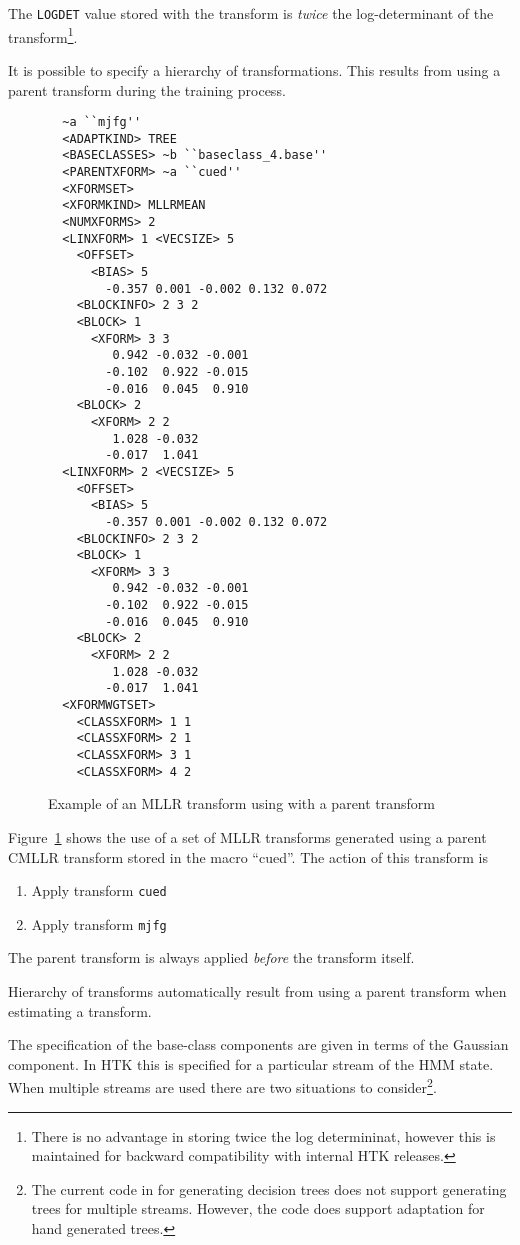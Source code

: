 The {\tt LOGDET} value stored with the transform is {\em twice} the 
log-determinant of the transform\footnote{There is no advantage in storing 
twice the log determininat, however this is maintained for backward
compatibility with internal HTK releases.}.

It is possible to specify a hierarchy of transformations. This results
from using a parent transform during the training process.
\begin{figure}[htbp]
\begin{verbatim}
  ~a ``mjfg''
  <ADAPTKIND> TREE
  <BASECLASSES> ~b ``baseclass_4.base''
  <PARENTXFORM> ~a ``cued''
  <XFORMSET>  
  <XFORMKIND> MLLRMEAN
  <NUMXFORMS> 2
  <LINXFORM> 1 <VECSIZE> 5
    <OFFSET> 
      <BIAS> 5
        -0.357 0.001 -0.002 0.132 0.072
    <BLOCKINFO> 2 3 2
    <BLOCK> 1
      <XFORM> 3 3
         0.942 -0.032 -0.001
        -0.102  0.922 -0.015
        -0.016  0.045  0.910
    <BLOCK> 2
      <XFORM> 2 2
         1.028 -0.032
        -0.017  1.041 
  <LINXFORM> 2 <VECSIZE> 5
    <OFFSET> 
      <BIAS> 5
        -0.357 0.001 -0.002 0.132 0.072
    <BLOCKINFO> 2 3 2
    <BLOCK> 1
      <XFORM> 3 3
         0.942 -0.032 -0.001
        -0.102  0.922 -0.015
        -0.016  0.045  0.910
    <BLOCK> 2
      <XFORM> 2 2
         1.028 -0.032
        -0.017  1.041 
  <XFORMWGTSET>
    <CLASSXFORM> 1 1
    <CLASSXFORM> 2 1
    <CLASSXFORM> 3 1
    <CLASSXFORM> 4 2
\end{verbatim}
\caption{Example of an MLLR transform using with a parent transform}
\label{fig:hiermllr}
\end{figure}
Figure~\ref{fig:hiermllr} shows the use of a set of MLLR transforms
generated using a parent CMLLR transform stored in the macro ``cued''. The
action of this transform is
\begin{enumerate}
\item Apply transform {\tt cued}
\item Apply transform {\tt mjfg}
\end{enumerate}
The parent transform is always applied {\it before} the transform
itself.

Hierarchy of transforms automatically result from using a parent transform
when estimating a transform. 

The specification of the base-class components are given in terms
of the Gaussian component. In HTK this is specified for a particular
stream of the HMM state. When multiple streams are used there are two 
situations to consider\footnote{The current code in  for 
generating decision trees does not support generating trees for multiple 
streams. However, the code does support adaptation for hand generated 
trees.}.

